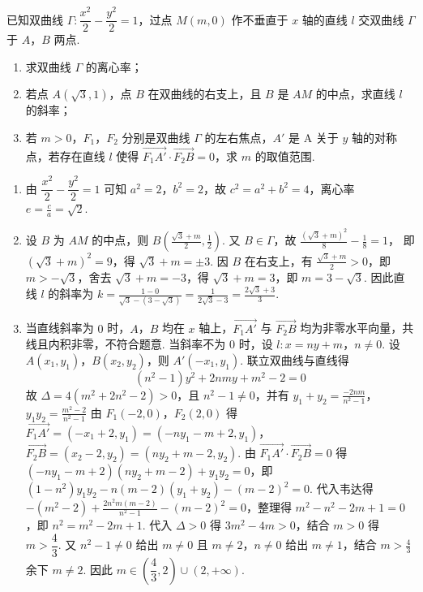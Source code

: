 \begin{problem}
已知双曲线 \(\Gamma:\dfrac{x^2}{2}-\dfrac{y^2}{2}=1\)，过点 \(M(m,0)\) 作不垂直于 \(x\) 轴的直线 \(l\) 交双曲线 \(\Gamma\) 于 \(A\)，\(B\) 两点.

\begin{enumerate}
\item 求双曲线 \(\Gamma\) 的离心率；
\item 若点 \(A(\sqrt3,1)\)，点 \(B\) 在双曲线的右支上，且 \(B\) 是 \(AM\) 的中点，求直线 \(l\) 的斜率；
\item 若 \(m>0\)，\(F_1\)，\(F_2\) 分别是双曲线 \(\Gamma\) 的左右焦点，\(A'\) 是 A 关于 \(y\) 轴的对称点，若存在直线 \(l\) 使得 \(\overrightarrow{F_1A'}\cdot\overrightarrow{F_2B}=0\)，求 \(m\) 的取值范围.
\end{enumerate}
\end{problem}

\begin{solution}
\begin{enumerate}
\item 由 \(\dfrac{x^2}{2}-\dfrac{y^2}{2}=1\) 可知 \(a^2=2\)，\(b^2=2\)，故 \(c^2=a^2+b^2=4\)，离心率 \(e=\frac ca=\sqrt2\).

\item 设 \(B\) 为 \(AM\) 的中点，则
\(B\left(\frac{\sqrt3+m}{2},\frac12\right)\).
又 \(B\in\Gamma\)，故
\(\frac{(\sqrt3+m)^2}{8}-\frac{1}{8}=1\)，
即 \((\sqrt3+m)^2=9\)，得 \(\sqrt3+m=\pm3\). 因 \(B\) 在右支上，有 \(\frac{\sqrt3+m}{2}>0\)，即 \(m>-\sqrt3\)，舍去 \(\sqrt3+m=-3\)，得 \(\sqrt3+m=3\)，即 \(m=3-\sqrt3\).
因此直线 \(l\) 的斜率为
\(k=\frac{1-0}{\sqrt3-(3-\sqrt3)}=\frac1{2\sqrt3-3}=\frac{2\sqrt3+3}{3}\).

\item 当直线斜率为 \(0\) 时，\(A\)，\(B\) 均在 \(x\) 轴上，\(\overrightarrow{F_1A'}\) 与 \(\overrightarrow{F_2B}\) 均为非零水平向量，共线且内积非零，不符合题意. 当斜率不为 \(0\) 时，设 \(l:x=ny+m\)，\(n\ne0\). 设 \(A(x_1,y_1)\)，\(B(x_2,y_2)\)，则 \(A'(-x_1,y_1)\).
联立双曲线与直线得
\[
(n^2-1)y^2+2nmy+m^2-2=0
\]
故 \(\Delta=4(m^2+2n^2-2)>0\)，且 \(n^2-1\ne0\)，并有
\(y_1+y_2=\frac{-2nm}{n^2-1}\)，\(y_1y_2=\frac{m^2-2}{n^2-1}\)
由 \(F_1(-2,0)\)，\(F_2(2,0)\) 得 \(\overrightarrow{F_1A'}=(-x_1+2,y_1)=(-ny_1-m+2,y_1)\)，\(\overrightarrow{F_2B}=(x_2-2,y_2)=(ny_2+m-2,y_2)\). 由 \(\overrightarrow{F_1A'}\cdot\overrightarrow{F_2B}=0\) 得 \((-ny_1-m+2)(ny_2+m-2)+y_1y_2=0\)，即 \((1-n^2)y_1y_2-n(m-2)(y_1+y_2)-(m-2)^2=0\). 代入韦达得 \(-(m^2-2)+\frac{2n^2m(m-2)}{n^2-1}-(m-2)^2=0\)，整理得 \(m^2-n^2-2m+1=0\)，即 \(n^2=m^2-2m+1\). 代入 \(\Delta>0\) 得 \(3m^2-4m>0\)，结合 \(m>0\) 得 \(m>\dfrac43\). 又 \(n^2-1\ne0\) 给出 \(m\ne0\) 且 \(m\ne2\)，\(n\ne0\) 给出 \(m\ne1\)，结合 \(m>\frac43\) 余下 \(m\ne2\). 因此 \(m\in\left(\dfrac43,2\right)\cup(2,+\infty)\).
\end{enumerate}
\end{solution}


